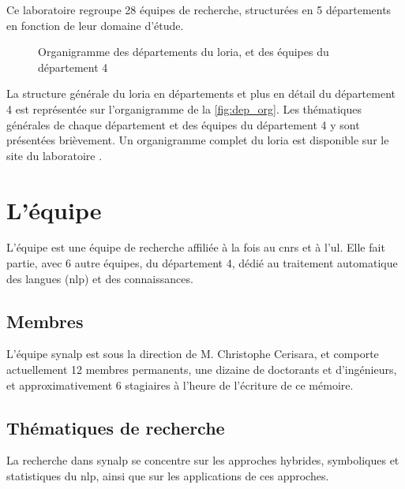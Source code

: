Ce laboratoire regroupe 28 équipes de recherche, structurées en 5 départements en fonction de leur domaine d'étude.

\begin{figure}[h]
	\centering
	\scalebox{1}{}
	\caption{Organigramme des départements du \gls{loria}, et des équipes du département 4}
	\label{fig:dep_org}
\end{figure}

La structure générale du \gls{loria} en départements et plus en détail du département 4 est représentée sur l'organigramme de la \autoref{fig:dep_org}. %
Les thématiques générales de chaque département et des équipes du département 4 y sont présentées brièvement.
Un organigramme complet du \gls{loria} est disponible sur {le site du laboratoire \autocite{org_loria}}.

\section{L'équipe }
L'équipe  est une équipe de recherche affiliée à la fois au \gls{cnrs} et à l'\gls{ul}.
Elle fait partie, avec 6 autre équipes, du département 4, dédié au traitement automatique des langues (\gls{nlp}) et des connaissances.

\subsection*{Membres}
L'équipe \gls{synalp} est sous la direction de M. Christophe Cerisara, et comporte actuellement 12 membres permanents, une dizaine de doctorants et d'ingénieurs, et approximativement 6 stagiaires à l'heure de l'écriture de ce mémoire.

\subsection*{Thématiques de recherche}
La recherche dans \gls{synalp} se concentre sur les approches hybrides, symboliques et statistiques du \gls{nlp}, ainsi que sur les applications de ces approches.


